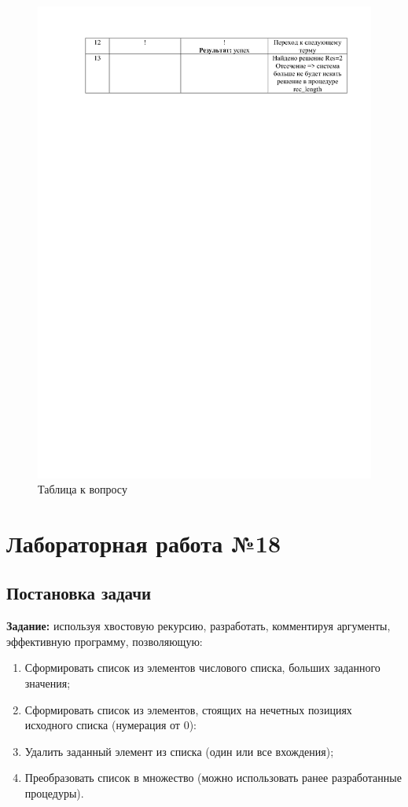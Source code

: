\documentclass[12pt]{report}
\begin{document}
\begin{figure}[H]
	\centering
	\includegraphics[scale=0.26]{lab_07_02.jpg}
	\caption{Таблица к вопросу}
	\label{d:matr_rec}
\end{figure}

\chapter*{Лабораторная работа №18}
\section*{Постановка задачи}

\textbf{Задание:} используя хвостовую рекурсию, разработать, комментируя аргументы, эффективную программу, позволяющую:
\begin{enumerate}
	\item Сформировать список из элементов числового списка, больших заданного значения;
	\item Сформировать список из элементов, стоящих на нечетных позициях исходного списка (нумерация от 0):
	\item Удалить заданный элемент из списка (один или все вхождения);
	\item Преобразовать список в множество (можно использовать ранее разработанные процедуры).
\end{enumerate}
\end{document}
